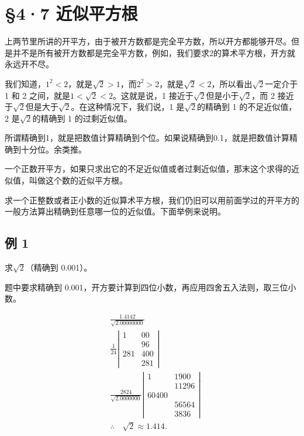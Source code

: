 \section{§4·7 近似平方根}

上两节里所讲的开平方，由于被开方数都是完全平方数，所以开方都能够开尽。但是并不是所有被开方数都是完全平方数，例如，我们要求2的算术平方根，开方就永远开不尽。

我们知道，\(1^{2}<2\)，就是\(\sqrt{2}>1\)，而\(2^{2}>2\)，就是\(\sqrt{2}<2\)，所以看出\(\sqrt{2}\)一定介于
1 和 2 之间，就是\(1<\sqrt{2}<2\)。这就是说，1
接近于\(\sqrt{2}\)但是小于\(\sqrt{2}\)，而 2
接近于\(\sqrt{2}\)但是大于\(\sqrt{2}\)。在这种情况下，我们说，1
是\(\sqrt{2}\)的精确到 1 的不足近似值，2 是\(\sqrt{2}\)的精确到 1
的过剩近似值。

所谓精确到1，就是把数值计算精确到个位。如果说精确到0.1，就是把数值计算精确到十分位。余类推。

一个正数开平方，如果只求出它的不足近似值或者过剩近似值，那末这个求得的近似值，叫做这个数的近似平方根。

求一个正整数或者正小数的近似算术平方根，我们仍旧可以用前面学过的开平方的一般方法算出精确到任意哪一位的近似值。下面举例来说明。

\subsection{例 1}

求\(\sqrt{2}\)（精确到 0.001）。

 题中要求精确到
0.001，开方要计算到四位小数，再应用四舍五入法则，取三位小数。


\[
\begin{array}{rl} & \frac{1.4142}{\sqrt {2.00000000}} \\ & \frac{1}{24} \left| \begin{array}{cc} 1 & 00 \\ & 96 \\ \hline 281 & 400 \\ & 281 \end{array} \right| \\ & \frac{2824}{\sqrt {2.0000000}} \left| \begin{array}{cc} 1 & 1900 \\ & 11296 \\ \hline 60400 \\ & 56564 \\ \hline {} & 3836 \end{array} \right| \\ & \therefore \quad \sqrt {2} \approx 1.414. \end{array}
\]

